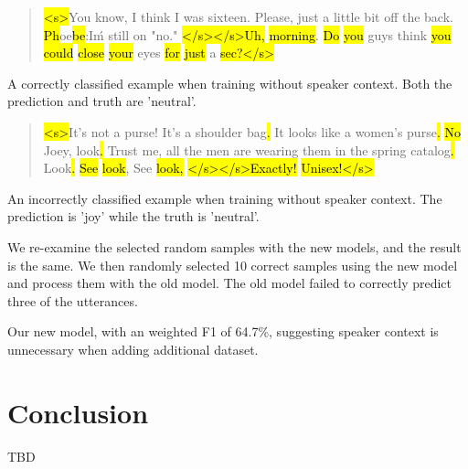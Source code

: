 \documentclass[11pt]{article}
\begin{document}
{\small
\begin{quote}

\hl{<s>}You know, I think I was sixteen. Please, just a little bit off the back. \hl{Ph}oe\hl{be}:I\'m still on "no." \hl{</s></s>Uh,} \hl{morning}. \hl{Do} \hl{you} guys think \hl{you} \hl{could} \hl{close} \hl{your} eyes \hl{for} \hl{just} a \hl{sec}\hl{?</s>}

\end{quote}

A correctly classified example when training without speaker context. Both the prediction and truth are 'neutral'.

\begin{quote}

\hl{<s>}It's not a purse! It's a shoulder bag\hl{.} It looks like a women's purse\hl{.} \hl{No} Joey, look\hl{.} Trust me, all the men are wearing them in the spring catalog\hl{.} Look\hl{.} \hl{See} \hl{look}, See \hl{look,} \hl{</s></s>Exactly!} \hl{Unisex!</s>}

\end{quote}

An incorrectly classified example when training without speaker context. The prediction is 'joy' while the truth is 'neutral'.}

We re-examine the selected random samples with the new models, and the result is the same. We then randomly selected 10 correct samples using the new model and process them with the old model. The old model failed to correctly predict three of the utterances.

Our new model, with an weighted F1 of 64.7\%, suggesting speaker context is unnecessary when adding additional dataset. 



\section{Conclusion}
\label{sect:conclusion}

TBD


\end{document}
